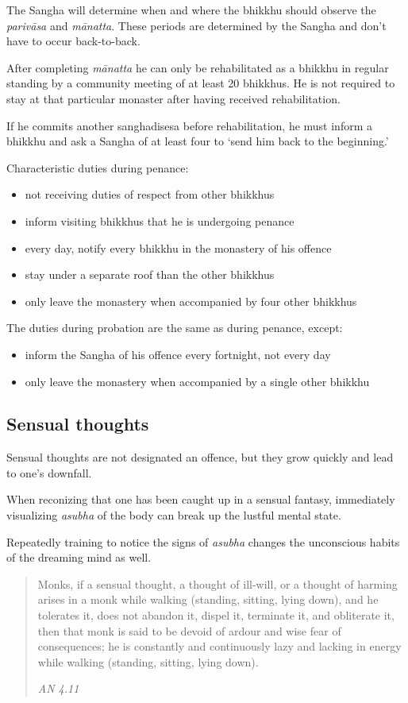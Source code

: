 The Sangha will determine when and where the bhikkhu should observe the
\emph{parivāsa} and \emph{mānatta}. These periods are determined by the
Sangha and don't have to occur back-to-back.

After completing \emph{mānatta} he can only be rehabilitated as a
bhikkhu in regular standing by a community meeting of at least 20
bhikkhus. He is not required to stay at that particular monaster after
having received rehabilitation.

If he commits another sanghadisesa before rehabilitation, he must inform
a bhikkhu and ask a Sangha of at least four to `send him back to the
beginning.'

Characteristic duties during penance:

\begin{itemize}
\tightlist
\item
  not receiving duties of respect from other bhikkhus
\item
  inform visiting bhikkhus that he is undergoing penance
\item
  every day, notify every bhikkhu in the monastery of his offence
\item
  stay under a separate roof than the other bhikkhus
\item
  only leave the monastery when accompanied by four other bhikkhus
\end{itemize}

The duties during probation are the same as during penance, except:

\begin{itemize}
\tightlist
\item
  inform the Sangha of his offence every fortnight, not every day
\item
  only leave the monastery when accompanied by a single other bhikkhu
\end{itemize}

\subsection{Sensual thoughts}

Sensual thoughts are not designated an offence, but they grow quickly
and lead to one's downfall.

When reconizing that one has been caught up in a sensual fantasy,
immediately visualizing \emph{asubha} of the body can break up the
lustful mental state.

Repeatedly training to notice the signs of \emph{asubha} changes the
unconscious habits of the dreaming mind as well.

\begin{quote}
Monks, if a sensual thought, a thought of ill-will, or a thought of
harming arises in a monk while walking (standing, sitting, lying down),
and he tolerates it, does not abandon it, dispel it, terminate it, and
obliterate it, then that monk is said to be devoid of ardour and wise
fear of consequences; he is constantly and continuously lazy and lacking
in energy while walking (standing, sitting, lying down).

\emph{AN 4.11}
\end{quote}


